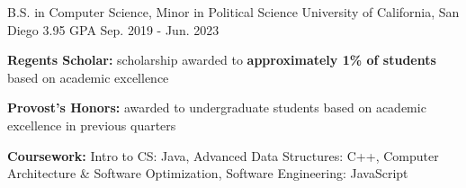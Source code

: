 

\begin{cventries}

    \cventry
    {B.S. in Computer Science, Minor in Political Science} %
    {University of California, San Diego} %
    {3.95 GPA} %
    {Sep. 2019 - Jun. 2023} %
    {
      \begin{cvitems} %
        \item {\textbf{Regents Scholar:} scholarship awarded to \textbf{approximately 1\% of students} based on academic excellence}
        \item {\textbf{Provost's Honors:} awarded to undergraduate students based on academic excellence in previous quarters}
        \item {\textbf{Coursework:} Intro to CS: Java, Advanced Data Structures: C++, Computer Architecture \& Software Optimization, Software Engineering: JavaScript}
      \end{cvitems}
    }

\end{cventries}

